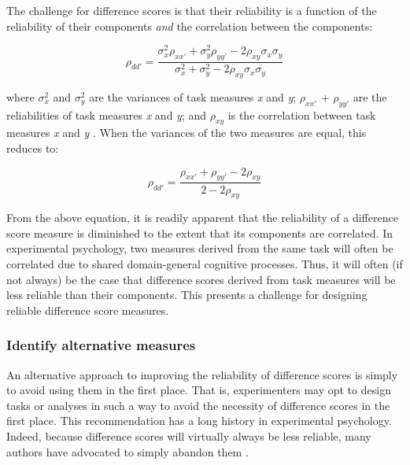 \documentclass[a4paper,notitlepage,12pt]{article}
\begin{document}
The challenge for difference scores is that their reliability is a function of the reliability of their components \textit{and} the correlation between the components:

\begin{equation}
    \rho_{dd'} = \frac{\sigma^2_x \rho_{xx'} + \sigma^2_y \rho_{yy'} - 2 \rho_{xy} \sigma_x \sigma_y}{\sigma^2_x + \sigma^2_y - 2 \rho_{xy} \sigma_x \sigma_y}
\end{equation}

where $\sigma^2_x$ and $\sigma^2_y$ are the variances of task measures \textit{x} and \textit{y}; $\rho_{xx'}$ + $\rho_{yy'}$ are the reliabilities of task measures \textit{x} and \textit{y}; and $\rho_{xy}$ is the correlation between task measures \textit{x} and \textit{y} \cite{trafimow2015defense, chiou1996reliability}. When the variances of the two measures are equal, this reduces to: 

\begin{equation}
    \rho_{dd'} = \frac{\rho_{xx'} + \rho_{yy'} - 2 \rho_{xy}}{2 - 2 \rho_{xy}}
\end{equation}

From the above equation, it is readily apparent that the reliability of a difference score measure is diminished to the extent that its components are correlated. In experimental psychology, two measures derived from the same task will often be correlated due to shared domain-general cognitive processes. Thus, it will often (if not always) be the case that difference scores derived from task measures will be less reliable than their components. This presents a challenge for designing reliable difference score measures. 


\subsubsection{Identify alternative measures}

An alternative approach to improving the reliability of difference scores is simply to avoid using them in the first place. That is, experimenters may opt to design tasks or analyses in such a way to avoid the necessity of difference scores in the first place. This recommendation has a long history in experimental psychology. Indeed, because difference scores will virtually always be less reliable, many authors have advocated to simply abandon them \cite{lord1956measurement, cronbach1970we, edwards2001ten}. 
\end{document}
